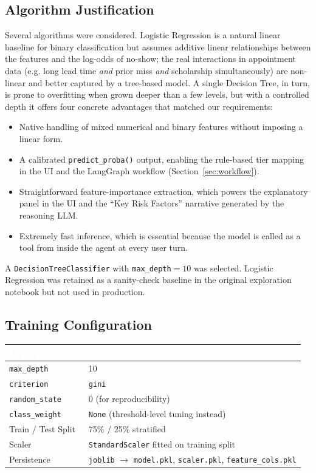 \documentclass[11pt,a4paper]{article}
\newcommand{\hdrrow}[1]{\textcolor{white}{\textbf{#1}}}
\newcommand{\hdrline}{\rowcolor{navy}}
\begin{document}
\subsection{Algorithm Justification}

Several algorithms were considered. Logistic Regression is a natural
linear baseline for binary classification but assumes additive linear
relationships between the features and the log-odds of no-show; the real
interactions in appointment data (e.g. long lead time \emph{and} prior
miss \emph{and} scholarship simultaneously) are non-linear and better
captured by a tree-based model. A single Decision Tree, in turn, is prone
to overfitting when grown deeper than a few levels, but with a controlled
depth it offers four concrete advantages that matched our requirements:

\begin{itemize}[leftmargin=1.2em]
  \item Native handling of mixed numerical and binary features without
        imposing a linear form.
  \item A calibrated \texttt{predict\_proba()} output, enabling the
        rule-based tier mapping in the UI and the LangGraph workflow
        (Section~\ref{sec:workflow}).
  \item Straightforward feature-importance extraction, which powers the
        explanatory panel in the UI and the ``Key Risk Factors'' narrative
        generated by the reasoning LLM.
  \item Extremely fast inference, which is essential because the model is
        called as a tool from inside the agent at every user turn.
\end{itemize}

A \texttt{DecisionTreeClassifier} with \texttt{max\_depth}$=10$ was
selected. Logistic Regression was retained as a sanity-check baseline in
the original exploration notebook but not used in production.

\subsection{Training Configuration}

\begin{tabularx}{\textwidth}{|>{\hsize=0.35\hsize}X|X|}
\hline
\hdrline \hdrrow{Hyperparameter} & \hdrrow{Value} \\ \hline
\texttt{max\_depth}         & 10 \\ \hline
\texttt{criterion}          & \texttt{gini} \\ \hline
\texttt{random\_state}      & 0 (for reproducibility) \\ \hline
\texttt{class\_weight}      & \texttt{None} (threshold-level tuning instead) \\ \hline
Train / Test Split          & 75\% / 25\% stratified \\ \hline
Scaler                      & \texttt{StandardScaler} fitted on training split \\ \hline
Persistence                 & \texttt{joblib} $\to$ \texttt{model.pkl}, \texttt{scaler.pkl}, \texttt{feature\_cols.pkl} \\ \hline
\end{tabularx}
\end{document}
